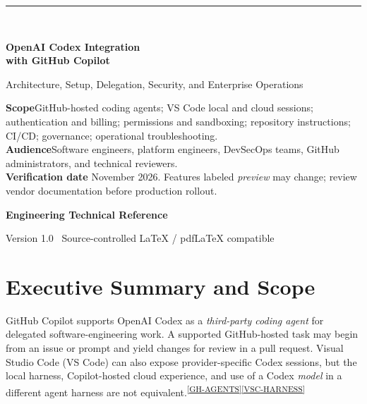 \documentclass[11pt,letterpaper,oneside]{article}
\newcommand{\src}[1]{\textsuperscript{\hyperref[ref:#1]{[#1]}}}
\begin{document}
\hypersetup{pageanchor=false}%
\begin{titlepage}
\thispagestyle{empty}
\vspace*{1.15in}
{\color{tealaccent}\rule{0.17\linewidth}{3pt}}\\[0.34in]
{\fontsize{29}{34}\selectfont\bfseries\color{navy}OpenAI Codex Integration\\[0.1em] with GitHub Copilot\par}
\vspace{0.24in}
{\Large\color{muted}Architecture, Setup, Delegation, Security, and Enterprise Operations\par}
\vspace{0.48in}
\begin{tcolorbox}[colback=pale,colframe=lightline,boxrule=.5pt,arc=2pt]
\textbf{Scope}\quad GitHub-hosted coding agents; VS Code local and cloud sessions; authentication and billing; permissions and sandboxing; repository instructions; CI/CD; governance; operational troubleshooting.\\[0.28em]
\textbf{Audience}\quad Software engineers, platform engineers, DevSecOps teams, GitHub administrators, and technical reviewers.\\[0.28em]
\textbf{Verification date} November 2026. Features labeled \emph{preview} may change; review vendor documentation before production rollout.
\end{tcolorbox}
\vfill
{\large\bfseries\color{navy}Engineering Technical Reference}\par
{\normalsize\color{muted}Version 1.0 \textbar\ Source-controlled LaTeX / pdfLaTeX compatible}\par
\vspace*{0.65in}
\end{titlepage}\hypersetup{pageanchor=true}
\tableofcontents
\newpage
{}

\section{Executive Summary and Scope}
GitHub Copilot supports OpenAI Codex as a \emph{third-party coding agent} for delegated software-engineering work. A supported GitHub-hosted task may begin from an issue or prompt and yield changes for review in a pull request. Visual Studio Code (VS Code) can also expose provider-specific Codex sessions, but the local harness, Copilot-hosted cloud experience, and use of a Codex \emph{model} in a different agent harness are not equivalent.\src{GH-AGENTS}\src{VSC-HARNESS}
\end{document}
